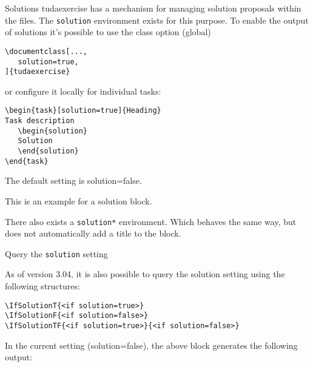 \documentclass[
	english,%
	accentcolor=9c,%
	points=true, to activate referencing task properties
]{tudaexercise}
\newcommand*{\cls}[1]{\textsf{#1}}
\newcommand*{\option}[1]{\texttt{#1}}
\newcommand*{\environment}[1]{\texttt{#1}}
\begin{document}
\begin{task}[solution=true]{Solutions}
	\cls{tudaexercise} has a mechanism for managing solution proposals within the files.
	The \environment{solution} environment exists for this purpose.
	To enable the output of solutions it's possible to use the class option (global)

\begin{verbatim}
\documentclass[...,
   solution=true,
]{tudaexercise}
\end{verbatim}
	or configure it locally for individual tasks:

\begin{verbatim}
\begin{task}[solution=true]{Heading}
Task description
   \begin{solution}
   Solution
   \end{solution}
\end{task}
\end{verbatim}

	The default setting is solution=false.

	\begin{solution}
		This is an example for a solution block.
	\end{solution}

	There also exists a \environment{solution*} environment. Which behaves the same way, but does not automatically add a title to the block.
\end{task}

\begin{task}{Query the \option{solution} setting}

	As of version 3.04, it is also possible to query the solution setting using the following structures:

\begin{verbatim}
\IfSolutionT{<if solution=true>}
\IfSolutionF{<if solution=false>}
\IfSolutionTF{<if solution=true>}{<if solution=false>}
\end{verbatim}
	In the current setting (solution=false), the above block generates the following output:


\end{task}
\end{document}
